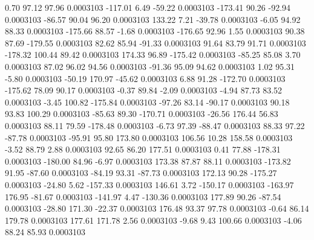         0.70       97.12       97.96     0.0003103
     -117.01        6.49      -59.22     0.0003103
     -173.41       90.26      -92.94     0.0003103
      -86.57       90.04       96.20     0.0003103
      133.22        7.21      -39.78     0.0003103
       -6.05       94.92       88.33     0.0003103
     -175.66       88.57       -1.68     0.0003103
     -176.65       92.96        1.55     0.0003103
       90.38       87.69     -179.55     0.0003103
       82.62       85.94      -91.33     0.0003103
       91.64       83.79       91.71     0.0003103
     -178.32      100.44       89.42     0.0003103
      174.33       96.89     -175.42     0.0003103
      -85.25       85.08        3.70     0.0003103
       87.02       96.02       94.56     0.0003103
      -91.36       95.09       94.62     0.0003103
        1.02       95.31       -5.80     0.0003103
      -50.19      170.97      -45.62     0.0003103
        6.88       91.28     -172.70     0.0003103
     -175.62       78.09       90.17     0.0003103
       -0.37       89.84       -2.09     0.0003103
       -4.94       87.73       83.52     0.0003103
       -3.45      100.82     -175.84     0.0003103
      -97.26       83.14      -90.17     0.0003103
       90.18       93.83      100.29     0.0003103
      -85.63       89.30     -170.71     0.0003103
      -26.56      176.44       56.83     0.0003103
       88.11       79.59     -178.48     0.0003103
       -6.73       97.39      -88.47     0.0003103
       88.33       97.22      -87.78     0.0003103
      -95.91       95.80      173.80     0.0003103
      106.56       10.28      158.58     0.0003103
       -3.52       88.79        2.88     0.0003103
       92.65       86.20      177.51     0.0003103
        0.41       77.88     -178.31     0.0003103
     -180.00       84.96       -6.97     0.0003103
      173.38       87.87       88.11     0.0003103
     -173.82       91.95      -87.60     0.0003103
      -84.19       93.31      -87.73     0.0003103
      172.13       90.28     -175.27     0.0003103
      -24.80        5.62     -157.33     0.0003103
      146.61        3.72     -150.17     0.0003103
     -163.97      176.95      -81.67     0.0003103
     -141.97        4.47     -130.36     0.0003103
      177.89       90.26      -87.54     0.0003103
      -28.80      171.30      -22.37     0.0003103
      176.48       93.37       97.78     0.0003103
       -0.64       86.14      179.78     0.0003103
      177.61      171.78        2.56     0.0003103
       -9.68        9.43      100.66     0.0003103
       -4.06       88.24       85.93     0.0003103
